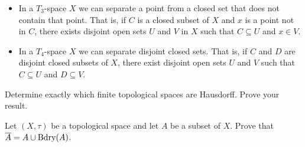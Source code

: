 \begin{itemize}
\begin{itemize}
	\item In a $T_3$-space $X$ we can separate a point from a closed set that does not contain that point. That is, if $C$ is a closed subset of $X$ and $x$ is a point not in $C$, there exists disjoint open sets $U$ and $V$ in $X$ such that $C \subseteq U$ and $x \in V$. 
	\item In a $T_4$-space $X$ we can separate disjoint closed sets. That is, if $C$ and $D$ are disjoint closed subsets of $X$, there exist disjoint open sets $U$ and $V$ such that $C \subseteq U$ and $D \subseteq V$.  
	\end{itemize}
	
\end{itemize}


\be

\item Determine exactly which finite topological spaces are Hausdorff. Prove your result.

\begin{comment}

\ExerciseSolution We will show that a finite topological space $(X,\tau)$ is Hausdorff if and only if $\tau$ is the discrete topology. Let $(X, \tau)$ be a finite topological space. Suppose that $X$ is Hausdorff. To prove that $\tau$ is the discrete metric, we show that every singleton set is open. Let $x \in X$. Since $X$ is Hausdorff, for every $y \in X$ there are open sets $O_x$ and $O_y$ such that $x \in O_x$, $y \in O_y$, and $O_x \cap O_y = \emptyset$.  Let $O = \bigcup_{\substack{y \ in X \\ y \neq x}} O_y$. Since there are only finite many points $y$, the set $O$ is a finite union of open sets and so $O$ is an open set. For each $y \in X \setminus \{x\}$, we know that $y  \in O_y$. Also, no $O_y$ contains $x$. So $O = X \setminus \{x\}$. Thus, $\{x\} = X \setminus O$ and so $\{x\}$ is an open set. It follows that $\tau$ is the discrete metric.

Now suppose that $\tau$ is the discrete metric. To show that $X$ is Hausdorff, let $x$, $y$ be distinct points in $X$. Then $\{x\}$ and $\{y\}$ are open and separate $x$ and $y$, so $X$ is Hausdorff. 

\end{comment}

\item Let $(X, \tau)$ be a topological space and let $A$ be a subset of $X$. Prove that $\overline{A} = A \cup \text{Bdry}(A)$. 

